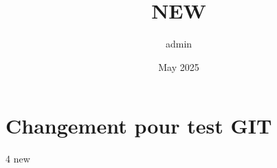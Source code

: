 \documentclass{article}
\title{NEW}
\author{admin }
\date{May 2025}
\begin{document}
\maketitle

\section{Changement pour test GIT}
4 new
\end{document}
